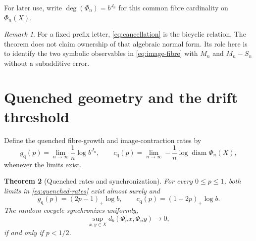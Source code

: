 \documentclass[11pt,a4paper]{amsart}
\newtheorem{theorem}{Theorem}[section]
\theoremstyle{definition}
\theoremstyle{remark}
\newtheorem{remark}[theorem]{Remark}
\newcommand{\diam}{\operatorname{diam}}
\newcommand{\degf}{\operatorname{deg}}
\begin{document}
For later use, write $\degf(\Phi_n)=b^{J_n}$ for this common fibre
cardinality on $\Phi_n(X)$.

\begin{remark}\label{rem:bicyclic}
For a fixed prefix letter, \eqref{eq:cancellation} is the bicyclic relation.
The theorem does not claim ownership of that algebraic normal form.  Its
role here is to identify the two symbolic observables in
\eqref{eq:image-fibre} with $M_n$ and $M_n-S_n$ without a subadditive error.
\end{remark}

\section{Quenched geometry and the drift threshold}
\label{sec:quenched}

Define the quenched fibre-growth and image-contraction rates by
\begin{equation}\label{eq:quenched-rates}
 g_{\mathrm q}(p)=\lim_{n\to\infty}\frac1n\log b^{J_n},
 \qquad
 c_{\mathrm q}(p)=\lim_{n\to\infty}
   -\frac1n\log\diam\Phi_n(X),
\end{equation}
whenever the limits exist.

\begin{theorem}[Quenched rates and synchronization]\label{thm:quenched}
For every $0\leq p\leq1$, both limits in \eqref{eq:quenched-rates} exist
almost surely and
\begin{equation}\label{eq:quenched-formulas}
 \boxed{
 g_{\mathrm q}(p)=(2p-1)_+\log b,
 \qquad
 c_{\mathrm q}(p)=(1-2p)_+\log b.}
\end{equation}
The random cocycle synchronizes uniformly,
\begin{equation}\label{eq:synchronization}
 \sup_{x,y\in X}d_b(\Phi_nx,\Phi_ny)\longrightarrow0,
\end{equation}
if and only if $p<1/2$.
\end{theorem}
\end{document}
